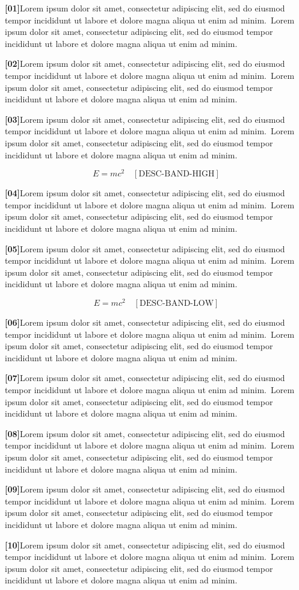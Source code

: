 \documentclass[twocolumn]{article}
\newcommand\Body{Lorem ipsum dolor sit amet, consectetur adipiscing elit, sed do
eiusmod tempor incididunt ut labore et dolore magna aliqua ut enim ad minim.}
\newcommand\Par[1]{\par\noindent\textbf{[#1]}\space\Body\ \Body\par\medskip}
\begin{document}
\Par{01}\Par{02}\Par{03}
\begin{wideband}[300pt]\[ E=mc^2 \quad[\text{DESC-BAND-HIGH}] \]\end{wideband}
\Par{04}\Par{05}
\begin{wideband}[120pt]\[ E=mc^2 \quad[\text{DESC-BAND-LOW}] \]\end{wideband}
\Par{06}\Par{07}\Par{08}\Par{09}\Par{10}
\end{document}
